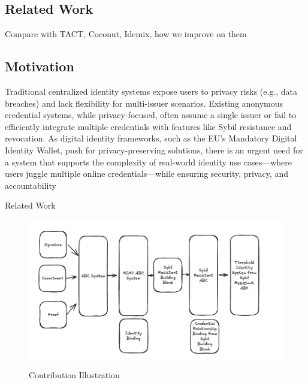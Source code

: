 \subsection{Related Work}
Compare with TACT, Coconut, Idemix, how we improve on them

\subsection{Motivation}



Traditional centralized identity systems expose users to privacy risks (e.g., data breaches) and lack flexibility for multi-issuer scenarios. Existing anonymous credential systems, while privacy-focused, often assume a single issuer or fail to efficiently integrate multiple credentials with features like Sybil resistance and revocation. As digital identity frameworks, such as the EU’s Mandatory Digital Identity Wallet, push for privacy-preserving solutions, there is an urgent need for a system that supports the complexity of real-world identity use cases—where users juggle multiple online credentials—while ensuring security, privacy, and accountability


Related Work
\begin{figure}
    \centering
    \includegraphics[width=0.75\linewidth]{contribution-illustration.png}
    \caption{Contribution Illustration}
    \label{fig:constribution-illustration}
\end{figure}